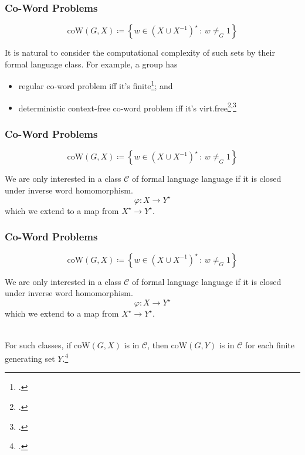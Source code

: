 \documentclass[11pt]{beamer}
\begin{document}
\begin{frame}
\frametitle{Co-Word Problems}

\begin{definition}
\[
\mathrm{coW}(G,X)
\coloneqq
\left\{
w \in \left(X \cup X^{-1} \right)^\star
\, :\,
w \neq_G 1
\right\}
\]
\end{definition}

\vspace*{1em}

It is natural to consider the computational complexity of such sets by their formal language class.
For example, a group has

\begin{itemize}
	\item
	regular co-word problem iff it's finite\footcite{anisimov1971}; and
	
	\item
	deterministic context-free co-word problem iff it's virt.\@ free\footcite{muller1983}\textsuperscript{,}\footcite{muller1985}
\end{itemize}

\end{frame}


\begin{frame}
\frametitle{Co-Word Problems}

\begin{definition}
	\[
	\mathrm{coW}(G,X)
	\coloneqq
	\left\{
	w \in \left(X \cup X^{-1} \right)^\star
	\, :\,
	w \neq_G 1
	\right\}
	\]
\end{definition}

\vspace*{1em}

We are only interested in a class $\mathcal{C}$ of formal language language if it is closed under inverse word homomorphism.
\pause
\[
	\varphi: X \to Y^\star
\]
which we extend to a map from $X^\star \to Y^\star$.

\end{frame}
\begin{frame}
\frametitle{Co-Word Problems}

\begin{definition}
	\[
	\mathrm{coW}(G,X)
	\coloneqq
	\left\{
	w \in \left(X \cup X^{-1} \right)^\star
	\, :\,
	w \neq_G 1
	\right\}
	\]
\end{definition}

\vspace*{1em}

We are only interested in a class $\mathcal{C}$ of formal language language if it is closed under inverse word homomorphism.
\[
\varphi: X \to Y^\star
\]
which we extend to a map from $X^\star \to Y^\star$.

\ \\

For such classes, if $\mathrm{coW}(G,X)$ is in $\mathcal{C}$, then
$\mathrm{coW}(G,Y)$ is in $\mathcal{C}$ for each finite generating set $Y$.\footcite{holt2005}

\end{frame}
\end{document}

